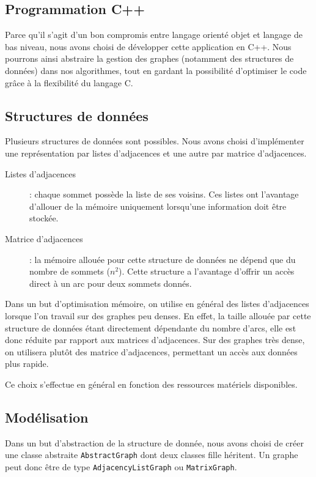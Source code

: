\subsection{Programmation C++}
Parce qu'il s'agit d'un bon compromis entre langage orienté objet et langage de bas niveau, nous avons choisi de développer cette application en C++. Nous pourrons ainsi abstraire la gestion des graphes (notamment des structures de données) dans nos algorithmes, tout en gardant la possibilité d'optimiser le code grâce à la flexibilité du langage C.

\subsection{Structures de données}

Plusieurs structures de données sont possibles. Nous avons choisi d'implémenter une représentation par listes d'adjacences et une autre par matrice d'adjacences.
\begin{description}
\item[Listes d'adjacences] : chaque sommet possède la liste de ses voisins. Ces listes ont l'avantage d'allouer de la mémoire uniquement lorsqu'une information doit être stockée. 
\item[Matrice d'adjacences] : la mémoire allouée pour cette structure de données ne dépend que du nombre de sommets ($n^2$). Cette structure a l'avantage d'offrir un accès direct à un arc pour deux sommets donnés.
\end{description}

Dans un but d'optimisation mémoire, on utilise en général des listes d'adjacences lorsque l'on travail sur des graphes peu denses. En effet, la taille allouée par cette structure de données étant directement dépendante du nombre d'arcs, elle est donc réduite par rapport aux matrices d'adjacences. Sur des graphes très dense, on utilisera plutôt des matrice d'adjacences, permettant un accès aux données plus rapide. 

Ce choix s'effectue en général en fonction des ressources matériels disponibles.

\subsection{Modélisation}
Dans un but d'abstraction de la structure de donnée, nous avons choisi de créer une classe abstraite \texttt{AbstractGraph} dont deux classes fille héritent. Un graphe peut donc être de type \texttt{AdjacencyListGraph} ou \texttt{MatrixGraph}.

